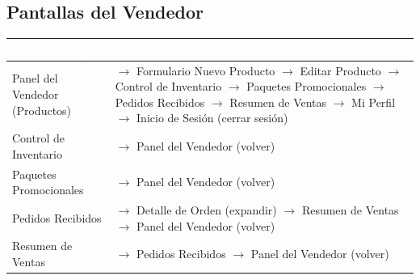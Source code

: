 \documentclass[12pt,a4paper]{article}
\begin{document}
\subsection{Pantallas del Vendedor}
\begin{longtable}{|p{5cm}|p{9cm}|}
\hline
\rowcolor{darkbg}\textcolor{white}{\textbf{Pantalla Origen}} & \textcolor{white}{\textbf{Puede ir a}} \\
\hline
Panel del Vendedor (Productos) & $\rightarrow$ Formulario Nuevo Producto \newline $\rightarrow$ Editar Producto \newline $\rightarrow$ Control de Inventario \newline $\rightarrow$ Paquetes Promocionales \newline $\rightarrow$ Pedidos Recibidos \newline $\rightarrow$ Resumen de Ventas \newline $\rightarrow$ Mi Perfil \newline $\rightarrow$ Inicio de Sesión (cerrar sesión) \\
\hline
Control de Inventario & $\rightarrow$ Panel del Vendedor (volver) \\
\hline
Paquetes Promocionales & $\rightarrow$ Panel del Vendedor (volver) \\
\hline
Pedidos Recibidos & $\rightarrow$ Detalle de Orden (expandir) \newline $\rightarrow$ Resumen de Ventas \newline $\rightarrow$ Panel del Vendedor (volver) \\
\hline
Resumen de Ventas & $\rightarrow$ Pedidos Recibidos \newline $\rightarrow$ Panel del Vendedor (volver) \\
\hline
\end{longtable}
\end{document}
